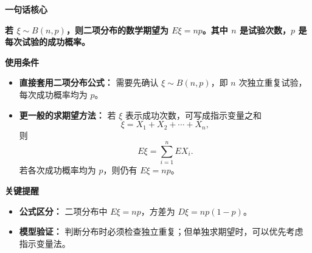 \begin{summarybox}
	\textbf{\textcolor{CSummary}{一句话核心}}

	\textbf{若 $\xi\sim B(n,p)$，则二项分布的数学期望为 $E\xi=np$。其中 $n$ 是试验次数，$p$ 是每次试验的成功概率。}

	\medskip
	\textbf{\textcolor{CSummary}{使用条件}}
	\begin{itemize}[leftmargin=*, itemsep=0.5em, topsep=0.4em]
		\item \textbf{直接套用二项分布公式：} 需要先确认 $\xi\sim B(n,p)$，即 $n$ 次独立重复试验，每次成功概率均为 $p$。
		\item \textbf{更一般的求期望方法：} 若 $\xi$ 表示成功次数，可写成指示变量之和
		      \[
			      \xi=X_1+X_2+\cdots+X_n,
		      \]
		      则
		      \[
			      E\xi=\sum_{i=1}^n EX_i.
		      \]
		      若各次成功概率均为 $p$，则仍有 $E\xi=np$。
	\end{itemize}

	\medskip
	\textbf{\textcolor{CSummary}{关键提醒}}
	\begin{itemize}[leftmargin=*, itemsep=0.5em, topsep=0.4em]
		\item \textbf{公式区分：} 二项分布中 $E\xi=np$，方差为 $D\xi=np(1-p)$。
		\item \textbf{模型验证：} 判断分布时必须检查独立重复；但单独求期望时，可以优先考虑指示变量法。
	\end{itemize}
\end{summarybox}